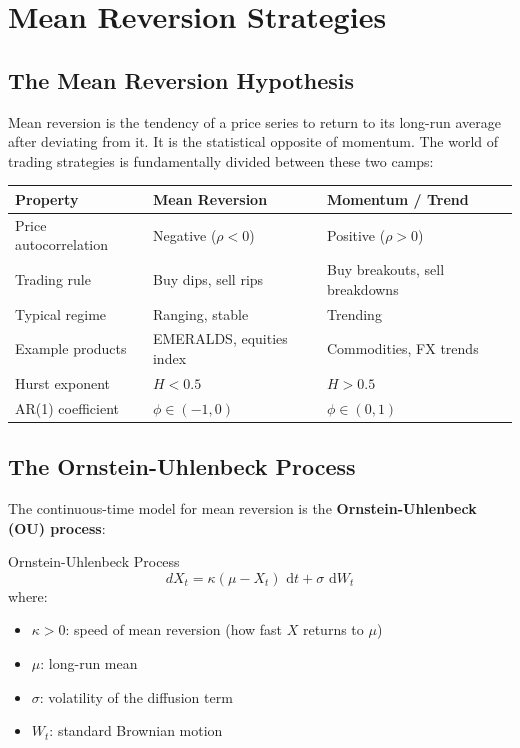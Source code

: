 \documentclass[12pt,a4paper,openany]{report}
\theoremstyle{definition}
\newcommand{\dd}{\,\mathrm{d}}
\begin{document}

\chapter{Mean Reversion Strategies}

\section{The Mean Reversion Hypothesis}

Mean reversion is the tendency of a price series to return to its long-run average after deviating from it. It is the statistical opposite of momentum. The world of trading strategies is fundamentally divided between these two camps:

\begin{center}
\begin{tabular}{lll}
\toprule
\textbf{Property} & \textbf{Mean Reversion} & \textbf{Momentum / Trend} \\
\midrule
Price autocorrelation & Negative ($\rho < 0$) & Positive ($\rho > 0$) \\
Trading rule & Buy dips, sell rips & Buy breakouts, sell breakdowns \\
Typical regime & Ranging, stable & Trending \\
Example products & EMERALDS, equities index & Commodities, FX trends \\
Hurst exponent & $H < 0.5$ & $H > 0.5$ \\
AR(1) coefficient & $\phi \in (-1, 0)$ & $\phi \in (0, 1)$ \\
\bottomrule
\end{tabular}
\end{center}

\section{The Ornstein-Uhlenbeck Process}

The continuous-time model for mean reversion is the \textbf{Ornstein-Uhlenbeck (OU) process}:

\begin{definitionbox}{Ornstein-Uhlenbeck Process}
\[
  dX_t = \kappa(\mu - X_t)\,\dd t + \sigma\,\dd W_t
\]
where:
\begin{itemize}
  \item $\kappa > 0$: speed of mean reversion (how fast $X$ returns to $\mu$)
  \item $\mu$: long-run mean
  \item $\sigma$: volatility of the diffusion term
  \item $W_t$: standard Brownian motion
\end{itemize}
\end{definitionbox}
\end{document}
